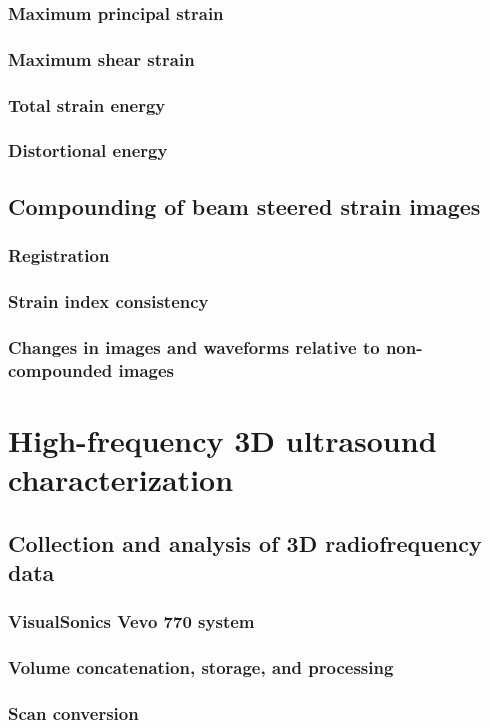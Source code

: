 \documentclass[12pt,twoside]{withesis}
\begin{document}
\subsection{Maximum principal strain}
\subsection{Maximum shear strain}
\subsection{Total strain energy}
\subsection{Distortional energy}

\section{Compounding of beam steered strain images}
\subsection{Registration}
\subsection{Strain index consistency}
\subsection{Changes in images and waveforms relative to non-compounded images}


\chapter{High-frequency 3D ultrasound characterization}

\section{Collection and analysis of 3D radiofrequency data}
\subsection{VisualSonics Vevo 770 system}
\subsection{Volume concatenation, storage, and processing}
\subsection{Scan conversion}
\end{document}
